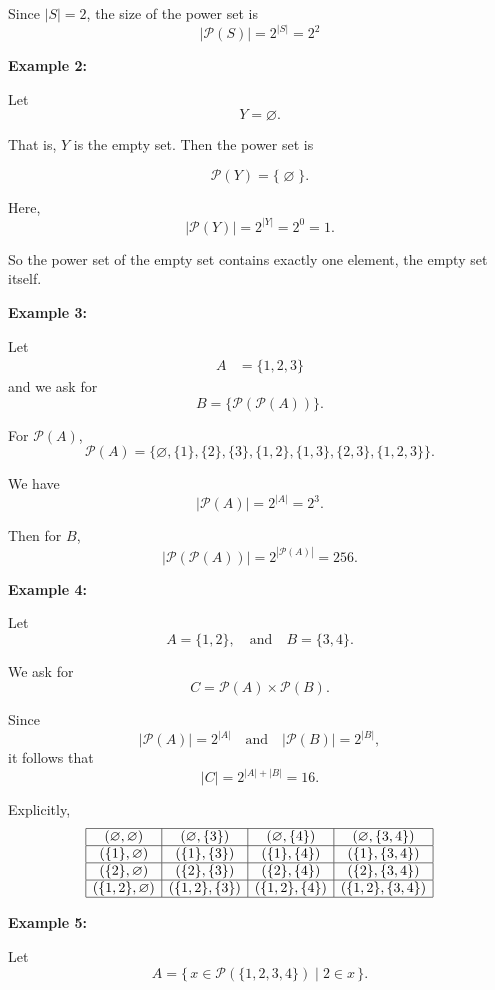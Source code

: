 \documentclass[12pt,a4paper,openany]{article}
\begin{document}
Since $|S| = 2$, the size of the power set is  
\[
\boxed{|\mathcal{P}(S)| = 2^{|S|} = 2^2}
\]


\textbf{Example 2:}

Let  
\[
Y = \varnothing.
\]  

That is, $Y$ is the empty set. Then the power set is  

\[
\mathcal{P}(Y) = \{\;\varnothing\;\}.
\]  

Here,  
\[
|\mathcal{P}(Y)| = 2^{|Y|} = 2^0 = 1.
\]  

So the power set of the empty set contains exactly one element, the empty set itself.


\textbf{Example 3:}

Let 
\[
\begin{aligned}
A &= \{1, 2, 3\}
\end{aligned}
\]
and we ask for 
\[
B = \{\mathcal{P}(\mathcal{P}(A))\}.
\]

For $\mathcal{P}(A)$,
\[
\mathcal{P}(A) = \{\varnothing, \{1\}, \{2\}, \{3\}, \{1,2\}, \{1,3\}, \{2,3\}, \{1,2,3\}\}.
\]

We have  
\[
|\mathcal{P}(A)| = 2^{|A|} = 2^3.
\]

Then for $B$,
\[
\boxed{|\mathcal{P}(\mathcal{P}(A))| = 2^{|\mathcal{P}(A)|} = 256.}
\]


\textbf{Example 4:}

Let  
\[
A = \{1,2\}, \quad \text{and} \quad B = \{3,4\}.
\]  

We ask for  
\[
C = \mathcal{P}(A) \times \mathcal{P}(B).
\]  

Since  
\[
|\mathcal{P}(A)| = 2^{|A|} 
\quad \text{and} \quad 
|\mathcal{P}(B)| = 2^{|B|},
\]  
it follows that  
\[
\boxed{|C| = 2^{|A|+|B|} = 16.}
\]

Explicitly,  
\[
\begin{array}{|c|c|c|c|}
\hline
(\varnothing,\varnothing) & (\varnothing,\{3\}) & (\varnothing,\{4\}) & (\varnothing,\{3,4\}) \\ \hline
(\{1\},\varnothing) & (\{1\},\{3\}) & (\{1\},\{4\}) & (\{1\},\{3,4\}) \\ \hline
(\{2\},\varnothing) & (\{2\},\{3\}) & (\{2\},\{4\}) & (\{2\},\{3,4\}) \\ \hline
(\{1,2\},\varnothing) & (\{1,2\},\{3\}) & (\{1,2\},\{4\}) & (\{1,2\},\{3,4\}) \\ \hline
\end{array}
\]


\textbf{Example 5:}

Let  
\[
A = \{\,x \in \mathcal{P}(\{1,2,3,4\}) \mid 2 \in x \,\}.
\]  
\end{document}
